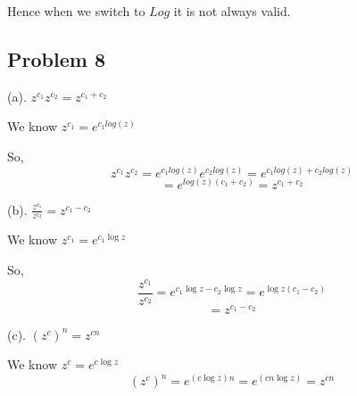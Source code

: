 \documentclass[a4paper]{report}
\begin{document}
 Hence  when we switch to $Log$ it is not always valid.


\subsection*{Problem 8}
(a). $z^{c_1} z^{c_2} = z^{c_1 + c_2}$

We know $z^{c_1} = e^{c_1 log(z)}$

So, 
$$ z^{c_1} z^{c_2} = e^{c_1 log(z)} e^{c_2 log(z)} = e^{c_1 log(z) + c_2log(z)}$$ 
$$ = e^{log(z)(c_1 + c_2)} = z^{c_1 + c_2} $$ 

(b). $\frac{z^{c_1}}{z^{c_2}} = z^{c_1- c_2}$ 

We know $z^{c_1} = e^{c_1 \log z}$

So, 
$$ \frac{z^{c_1}}{z^{c_2}} = e^{c_1 \log z - c_2 \log z}  = e^{\log z(c_1 - c_2)}$$ 
$$ = z^{c_1 - c_2} $$ 


(c). $(z^{c})^n = z^{cn}$


We know $z^{c} = e^{c \log z}$
$$(z^{c})^n = e^{(c \log z)n} = e^{(cn \log z)} = z^{cn}$$
\end{document}
